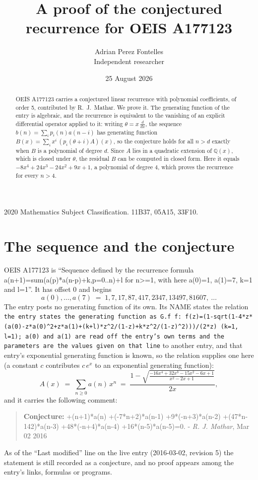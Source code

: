 \documentclass[11pt,a4paper]{article}
\title{A proof of the conjectured recurrence for OEIS A177123}
\author{Adrian Perez Fontelles\\ \small Independent researcher}
\date{25 August 2026}
\theoremstyle{plain}
\theoremstyle{definition}
\begin{document}
\maketitle

\begin{abstract}
OEIS A177123 carries a conjectured linear recurrence with polynomial coefficients, of
order 5, contributed by R.~J.~Mathar. We prove it. The generating function of the
entry is algebraic, and the recurrence is equivalent to the vanishing of an explicit
differential operator applied to it: writing $\theta=x\,\frac{d}{dx}$, the sequence
$b(n)=\sum_{i}p_{i}(n)a(n-i)$ has generating function
$B(x)=\sum_{i}x^{i}\,(p_{i}(\theta+i)A)(x)$, so the conjecture holds for all $n>d$ exactly
when $B$ is a polynomial of degree $d$. Since $A$ lies in a quadratic extension of
$\mathbb{Q}(x)$, which is closed under $\theta$, the residual $B$ can be computed in
closed form. Here it equals $- 8 x^{4} + 24 x^{3} - 24 x^{2} + 9 x + 1$, a polynomial of degree $4$, which proves
the recurrence for every $n>4$.
\end{abstract}

\noindent\small 2020 Mathematics Subject Classification. 11B37, 05A15, 33F10.\normalsize

\section{The sequence and the conjecture}

OEIS A177123 is ``Sequence defined by the recurrence formula a(n+1)=sum(a(p)*a(n-p)+k,p=0..n)+l for n>=1, with here a(0)=1, a(1)=7, k=1 and l=1''. It has offset $0$ and begins
\[
a(0),\dots,a(7)\;=\;1, 7, 17, 87, 417, 2347, 13497, 81607,\ \dots
\]
The entry posts no generating function of its own. Its NAME states the
relation \texttt{the entry states the generating function as G.f f: f(z)=(1-sqrt(1-4*z*(a(0)-z*a(0)\textasciicircum{}2+z*a(1)+(k+l)*z\textasciicircum{}2/(1-z)+k*z\textasciicircum{}2/(1-z)\textasciicircum{}2)))/(2*z) (k=1, l=1); a(0) and a(1) are read off the entry's own terms and the parameters are the values given on that line} to another entry, and that entry's exponential generating
function is known, so the relation supplies one here (a constant $c$ contributes
$c\,e^{x}$ to an exponential generating function):
\begin{equation}\label{eq:gf}
A(x)\;=\;\sum_{n\ge 0} a(n)\,x^{n}\;=\;\frac{1 - \sqrt{\frac{- 16 x^{4} + 32 x^{3} - 15 x^{2} - 6 x + 1}{x^{2} - 2 x + 1}}}{2 x} ,
\end{equation}
and it carries the following comment:
\begin{quote}\small
\textbf{Conjecture:} +(n+1)*a(n) +(-7*n+2)*a(n-1) +9*(-n+3)*a(n-2) +(47*n-142)*a(n-3) +48*(-n+4)*a(n-4) +16*(n-5)*a(n-5)=0. - \emph{R. J. Mathar}, Mar 02 2016
\end{quote}
As of the ``Last modified'' line on the live entry (2016-03-02, revision 5) the
statement is still recorded as a conjecture, and no proof appears among the entry's links,
formulas or programs.
\end{document}

